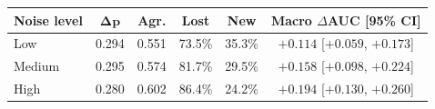 \begin{tabular}{@{}lccccc@{}}
\toprule
\textbf{Noise level} & $\boldsymbol{\Delta p}$ & \textbf{Agr.} & \textbf{Lost} & \textbf{New} & \textbf{Macro $\Delta$AUC [95\% CI]} \\
\midrule
Low & 0.294 & 0.551 & 73.5\% & 35.3\% & $+0.114$ [$+0.059$, $+0.173$] \\
Medium & 0.295 & 0.574 & 81.7\% & 29.5\% & $+0.158$ [$+0.098$, $+0.224$] \\
High & 0.280 & 0.602 & 86.4\% & 24.2\% & $+0.194$ [$+0.130$, $+0.260$] \\
\bottomrule
\end{tabular}
